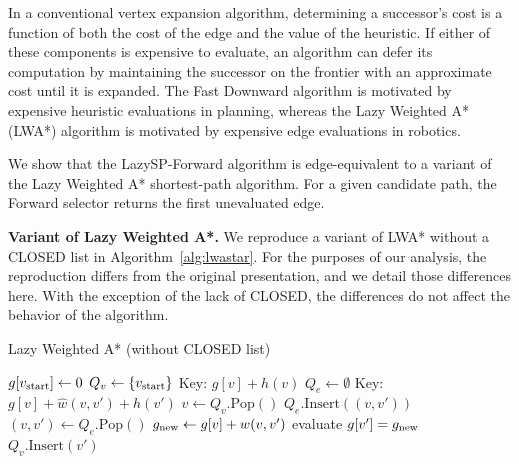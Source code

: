 \documentclass[nobib]{tufte-book}
\newcommand{\ms}[1]{\mbox{\scriptsize #1}}
\begin{document}
In a conventional vertex expansion algorithm,
determining a successor's cost is a function of both
the cost of the edge and the value of the heuristic.
If either of these components is expensive to evaluate,
an algorithm can defer its computation by maintaining the successor
on the frontier with an approximate cost until it is expanded.
The Fast Downward algorithm \citep{helmert2006fastdownward} is motivated
by expensive heuristic evaluations in planning,
whereas the Lazy Weighted A* (LWA*) algorithm \citep{cohen2014narms}
is motivated by expensive edge evaluations in robotics.

We show that the LazySP-Forward algorithm
is edge-equivalent to a variant of the Lazy Weighted A*
shortest-path algorithm.
For a given candidate path,
the Forward selector returns the first unevaluated edge.

\textbf{Variant of Lazy Weighted A*.}
We reproduce a variant of LWA* without a CLOSED list
in Algorithm~\ref{alg:lwastar}.
For the purposes of our analysis,
the reproduction differs from the original presentation,
and we detail those differences here.
With the exception of the lack of CLOSED,
the differences do not affect the behavior of the algorithm.

\begin{algorithm}[t]
\caption{Lazy Weighted A* (without CLOSED list)}
\label{alg:lwastar}
\begin{algorithmic}[1]
\State $g[v_{\ms{start}}] \leftarrow 0$
\State $Q_v \leftarrow \{ v_{\ms{start}} \}$
   \Comment Key: $g[v] + h(v)$
   \label{line:lwastar-key-qvertices}
\State $Q_e \leftarrow \emptyset$
   \Comment Key: $g[v] + \hat{w}(v,v') + h(v')$
   \label{line:lwastar-key-qedges}
\While {$\min(Q_v.{\mbox{TopKey}}, Q_e.{\mbox{TopKey}}) < g[v_{\ms{goal}}]$}
      \State $v \leftarrow Q_v.{\mbox{Pop}}()$
         \State $Q_e.\mbox{Insert}((v,v'))$
      \EndFor
   \Else
      \State $(v,v') \leftarrow Q_e.{\mbox{Pop}}()$
         \label{line:lwastar-test}
      \EndIf
      \State $g_{\ms{new}} \leftarrow g[v] + w(v,v')$
         \Comment evaluate
      \If {$g_{\ms{new}} < g[v']$}
         \State $g[v'] = g_{\ms{new}}$
         \State $Q_v.\mbox{Insert}(v')$
      \EndIf
   \EndIf
\EndWhile
\EndFunction
\end{algorithmic}
\end{algorithm}
\end{document}
